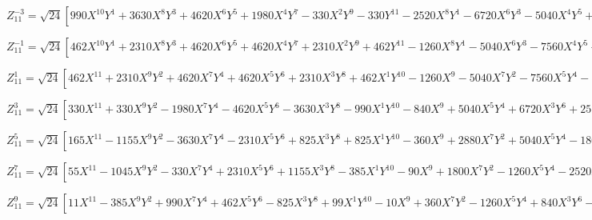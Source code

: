 \documentclass[10pt,landscape]{article}
\begin{document}
\vspace{1.2 mm}
\noindent $ Z^{-3}_{11} = \sqrt{24} [990X^{10}Y^{1} +3630X^{8}Y^{3} +4620X^{6}Y^{5} +1980X^{4}Y^{7} -330X^{2}Y^{9} -330Y^{11} -2520X^{8}Y^{1} -6720X^{6}Y^{3} -5040X^{4}Y^{5} +840Y^{9} +2268X^{6}Y^{1} +3780X^{4}Y^{3} +756X^{2}Y^{5} -756Y^{7} -840X^{4}Y^{1} -560X^{2}Y^{3} +280Y^{5} +105X^{2}Y^{1} -35Y^{3}] $

\vspace{1.2 mm}
\noindent $ Z^{-1}_{11} = \sqrt{24} [462X^{10}Y^{1} +2310X^{8}Y^{3} +4620X^{6}Y^{5} +4620X^{4}Y^{7} +2310X^{2}Y^{9} +462Y^{11} -1260X^{8}Y^{1} -5040X^{6}Y^{3} -7560X^{4}Y^{5} -5040X^{2}Y^{7} -1260Y^{9} +1260X^{6}Y^{1} +3780X^{4}Y^{3} +3780X^{2}Y^{5} +1260Y^{7} -560X^{4}Y^{1} -1120X^{2}Y^{3} -560Y^{5} +105X^{2}Y^{1} +105Y^{3} -6Y^{1}] $

\vspace{1.2 mm}
\noindent $ Z^{1}_{11} = \sqrt{24} [462X^{11} +2310X^{9}Y^{2} +4620X^{7}Y^{4} +4620X^{5}Y^{6} +2310X^{3}Y^{8} +462X^{1}Y^{10} -1260X^{9} -5040X^{7}Y^{2} -7560X^{5}Y^{4} -5040X^{3}Y^{6} -1260X^{1}Y^{8} +1260X^{7} +3780X^{5}Y^{2} +3780X^{3}Y^{4} +1260X^{1}Y^{6} -560X^{5} -1120X^{3}Y^{2} -560X^{1}Y^{4} +105X^{3} +105X^{1}Y^{2} -6X^{1}] $

\vspace{1.2 mm}
\noindent $ Z^{3}_{11} = \sqrt{24} [330X^{11} +330X^{9}Y^{2} -1980X^{7}Y^{4} -4620X^{5}Y^{6} -3630X^{3}Y^{8} -990X^{1}Y^{10} -840X^{9} +5040X^{5}Y^{4} +6720X^{3}Y^{6} +2520X^{1}Y^{8} +756X^{7} -756X^{5}Y^{2} -3780X^{3}Y^{4} -2268X^{1}Y^{6} -280X^{5} +560X^{3}Y^{2} +840X^{1}Y^{4} +35X^{3} -105X^{1}Y^{2}] $

\vspace{1.2 mm}
\noindent $ Z^{5}_{11} = \sqrt{24} [165X^{11} -1155X^{9}Y^{2} -3630X^{7}Y^{4} -2310X^{5}Y^{6} +825X^{3}Y^{8} +825X^{1}Y^{10} -360X^{9} +2880X^{7}Y^{2} +5040X^{5}Y^{4} -1800X^{1}Y^{8} +252X^{7} -2268X^{5}Y^{2} -1260X^{3}Y^{4} +1260X^{1}Y^{6} -56X^{5} +560X^{3}Y^{2} -280X^{1}Y^{4}] $

\vspace{1.2 mm}
\noindent $ Z^{7}_{11} = \sqrt{24} [55X^{11} -1045X^{9}Y^{2} -330X^{7}Y^{4} +2310X^{5}Y^{6} +1155X^{3}Y^{8} -385X^{1}Y^{10} -90X^{9} +1800X^{7}Y^{2} -1260X^{5}Y^{4} -2520X^{3}Y^{6} +630X^{1}Y^{8} +36X^{7} -756X^{5}Y^{2} +1260X^{3}Y^{4} -252X^{1}Y^{6}] $

\vspace{1.2 mm}
\noindent $ Z^{9}_{11} = \sqrt{24} [11X^{11} -385X^{9}Y^{2} +990X^{7}Y^{4} +462X^{5}Y^{6} -825X^{3}Y^{8} +99X^{1}Y^{10} -10X^{9} +360X^{7}Y^{2} -1260X^{5}Y^{4} +840X^{3}Y^{6} -90X^{1}Y^{8}] $
\end{document}
